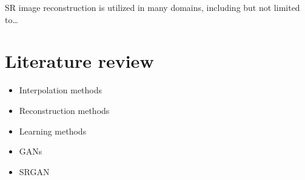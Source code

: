 SR image reconstruction is utilized in many domains, including but not limited to\dots

\section{Literature review}

\begin{itemize}
    \item Interpolation methods
    \item Reconstruction methods
    \item Learning methods
    \item GANs
    \item SRGAN
\end{itemize}